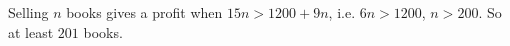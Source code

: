 Selling $n$ books gives a profit when $15n>1200+9n$, i.e. $6n>1200$, $n>200$. So at least $\boxed{201}$ books.
